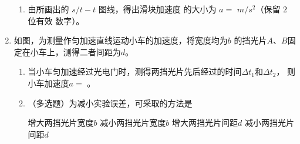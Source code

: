 \begin{enumerate}
\begin{enumerate}
\item 
由所画出的 $ s/t-t $ 图线，得出滑块加速度
的大小为 $ a=$  $m/s^{2} $（保留 $ 2 $ 位有效
数字）。



\end{enumerate}


\newpage
\item
{}
如图，为测量作匀加速直线运动小车的加速度，将宽度均为$ b $
的挡光片$ A $、$ B $固定在小车上，测得二者间距为$ d $。
\begin{figure}[h!]
\centering

\end{figure}

\begin{enumerate}
\renewcommand{\labelenumi}{\arabic{enumi}.}
\item
当小车匀加速经过光电门时，测得两挡光片先后经过的时间$ \Delta t_{1} $和$ \Delta t_{2} $，
则小车加速度$ a= $  
。

\item 
（多选题）为减小实验误差，可采取的方法是  

\fourchoices
{增大两挡光片宽度$ b $}
{减小两挡光片宽度$ b $}
{增大两挡光片间距$ d $}
{减小两挡光片间距$ d $}


\end{enumerate}


\end{enumerate}

